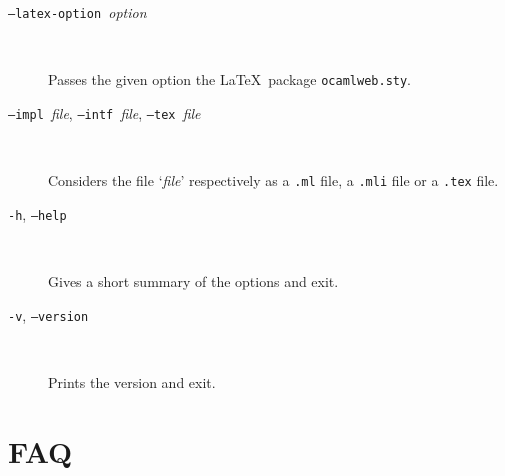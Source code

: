 \documentclass[12pt]{article}
\begin{document}
\begin{description}
\item[\texttt{--latex-option }\textit{option}] ~\par

  Passes the given option the \LaTeX\ package \texttt{ocamlweb.sty}. 

\item[\texttt{--impl }\textit{file}, \texttt{--intf }\textit{file}, 
      \texttt{--tex }\textit{file}] ~\par

  Considers the file `\textit{file}' respectively as a \verb!.ml! file, a
  \verb!.mli! file or a \verb!.tex! file.

\item[\texttt{-h}, \texttt{--help}] ~\par

  Gives a short summary of the options and exit.

\item[\texttt{-v}, \texttt{--version}] ~\par

  Prints the version and exit.

\end{description}


\section{FAQ}
\end{document}
